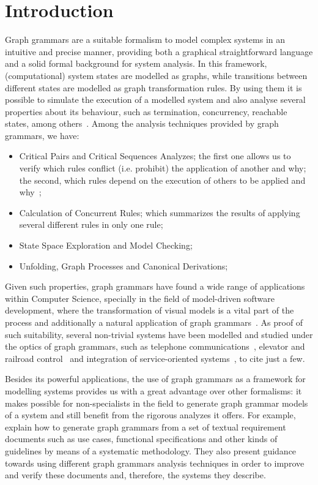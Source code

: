 \chapter{Introduction}

Graph grammars are a suitable formalism to model complex systems in an intuitive and precise manner, providing both a graphical straightforward language and a solid formal background for system analysis. In this framework, (computational) system states are modelled as graphs, while transitions between different states are modelled as graph transformation rules. By using them it is possible to simulate the execution of a modelled system and also analyse several properties about its behaviour, such as termination, concurrency, reachable states, among others~\cite{Ehrig2006}. Among the analysis techniques provided by graph grammars, we have:

\begin{itemize}
  \item Critical Pairs and Critical Sequences Analyzes; the first one allows us to verify which rules conflict (i.e. prohibit) the application of another and why; the second, which rules depend on the execution of others to be applied and why~\cite{Lambers2008a}; 
  \item Calculation of Concurrent Rules; which summarizes the results of applying several different rules in only one rule; 
  \item State Space Exploration and Model Checking; 
  \item Unfolding, Graph Processes and Canonical Derivations; 
\end{itemize}


Given such properties, graph grammars have found a wide range of applications within Computer Science, specially in the field of model-driven software development, where the transformation of visual models is a vital part of the process and additionally a natural application of graph grammars~\cite{Rozenberg1997}. As proof of such suitability, several non-trivial systems have been modelled and studied under the optics of graph grammars, such as telephone communications~\cite{Ribeiro1996}, elevator and railroad control~\cite{Lambers2010, Pennemann2009} and integration of service-oriented systems~\cite{Giese2015}, to cite just a few.

Besides its powerful applications, the use of graph grammars as a framework for modelling systems provides us with a great advantage over other formalisms: it makes possible for non-specialists in the field to generate graph grammar models of a system and still benefit from the rigorous analyzes it offers. For example, ~\cite{Junior2015,BezerraWEIT2016,Cota2017} explain how to generate graph grammars from a set of textual requirement documents such as use cases, functional specifications and other kinds of guidelines by means of a systematic methodology. They also present guidance towards using different graph grammars analysis techniques in order to improve and verify these documents and, therefore, the systems they describe.

